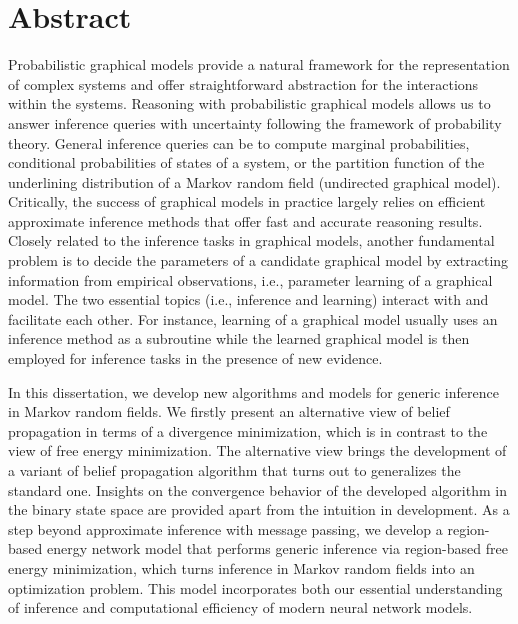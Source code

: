 \chapter{Abstract}
Probabilistic graphical models provide a natural framework for the representation of complex systems and offer straightforward abstraction for the interactions within the systems. Reasoning with probabilistic graphical models allows us to answer inference queries with uncertainty following the framework of probability theory. General inference queries can be to compute marginal probabilities, conditional probabilities of states of a system, or the partition function of the underlining distribution of a Markov random field (undirected graphical model). Critically, the success of graphical models in practice largely relies on efficient approximate inference methods that offer fast and accurate reasoning results. Closely related to the inference tasks in graphical models, another fundamental problem is to decide the parameters of a candidate graphical model by extracting information from empirical observations, i.e., parameter learning of a graphical model. The two essential topics (i.e., inference and learning) interact with and facilitate each other. For instance, learning of a graphical model usually uses an inference method as a subroutine while the learned graphical model is then employed for inference tasks in the presence of new evidence.

In this dissertation, we develop new algorithms and models for generic inference in Markov random fields. We firstly present an alternative view of belief propagation in terms of a divergence minimization, which is in contrast to the view of free energy minimization. The alternative view brings the development of a variant of belief propagation algorithm that turns out to generalizes the standard one. Insights on the convergence behavior of the developed algorithm in the binary state space are provided apart from the intuition in development. As a step beyond approximate inference with message passing, we develop a region-based energy network model that performs generic inference via region-based free energy minimization, which turns inference in Markov random fields into an optimization problem. This model incorporates both our essential understanding of inference and computational efficiency of modern neural network models.

